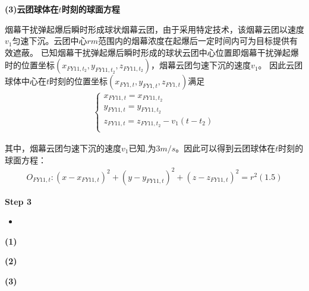 \documentclass[../main.tex]{subfiles}
\begin{document}
\noindent \textbf{(3)云团球体在$t$时刻的球面方程 }
\par 烟幕干扰弹起爆后瞬时形成球状烟幕云团，由于采用特定技术，该烟幕云团以速度$v_1$匀速下沉。云团中心$rm$范围内的烟幕浓度在起爆后一定时间内可为目标提供有效遮蔽。
已知烟幕干扰弹起爆后瞬时形成的球状云团中心位置即烟幕干扰弹起爆时的位置坐标$\left( x_{FY11,t_2},y_{FY11,t_2},z_{FY11,t_2} \right)$，烟幕云团匀速下沉的速度$v_1$。
因此云团球体中心在$t$时刻的位置坐标$(x_{FY1,t}, y_{FY1,{t}}, z_{FY1,{t}})$满足
\begin{align}\label{1.10}
\left\{ \begin{array}{l}
	x_{FY11,t}=x_{FY11,t_2}\\
	y_{FY11,t}=y_{FY11,t_2}\\
	z_{FY11,t}=z_{FY11,t_2}-v_1\left( t-t_2 \right)\\
\end{array} \right. 
\end{align}
\par 其中，烟幕云团匀速下沉的速度$v_1$已知,为$3m/s$。因此可以得到云团球体在$t$时刻的球面方程：
\begin{align}\label{1.11}
O_{FY11,t}:\left( x-x_{FY11,t} \right) ^2+\left( y-y_{FY11,t} \right) ^2+\left( z-z_{FY11,t} \right) ^2=r^2\left( 1.5 \right) 
\end{align}


\textbf{Step 3 }
\begin{itemize}
\item \textbf{}
\end{itemize}
\par \textbf{(1) }
\par \textbf{(2) }
\par \textbf{(3) }
\end{document}
